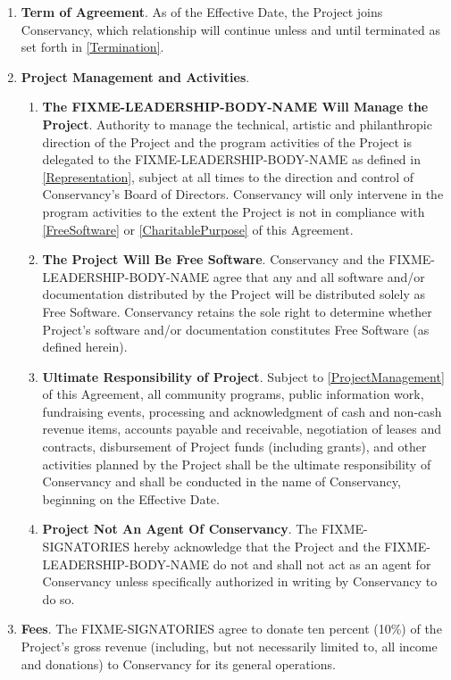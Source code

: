 \documentclass[letterpaper,12pt]{article}
\newcommand{\signatories}{FIXME-SIGNATORIES\xspace}
\newcommand{\leadershipbody}{FIXME-LEADERSHIP-BODY-NAME\xspace}
\begin{document}
\begin{enumerate}[label=\arabic*.,ref=\S~\arabic*]
\item \textbf{Term of Agreement}. As of the Effective Date, the Project
joins Conservancy, which relationship will continue unless and until
terminated as set forth in \ref{Termination}. 
\item \textbf{Project Management and Activities}.


\begin{enumerate}[label=\alph*.,ref=\theenumi(\alph*)]
\item \textbf{The \leadershipbody Will Manage the Project}. \label{ProjectManagement}
Authority to manage the technical, artistic and philanthropic direction
of the Project and the program activities of the Project is delegated
to the \leadershipbody as defined in \ref{Representation},
subject at all times to the direction and control of Conservancy's
Board of Directors. Conservancy will only intervene in the program
activities to the extent the Project is not in compliance with \ref{FreeSoftware}
or \ref{CharitablePurpose} of this Agreement. 
\item \textbf{The Project Will Be Free Software}. \label{FreeSoftware}
Conservancy and the \leadershipbody agree that any and all software
and/or documentation distributed by the Project will be distributed solely as Free Software.
Conservancy retains the sole right to determine whether Project's
software and/or documentation constitutes Free Software (as defined herein).
\item \textbf{Ultimate Responsibility of Project}. Subject to \ref{ProjectManagement}
of this Agreement, all community programs, public information work,
fundraising events, processing and acknowledgment of cash and non-cash
revenue items, accounts payable and receivable, negotiation of leases
and contracts, disbursement of Project funds (including grants), and
other activities planned by the Project shall be the ultimate responsibility
of Conservancy and shall be conducted in the name of Conservancy,
beginning on the Effective Date. 
\item \textbf{Project Not An Agent Of Conservancy}. The \signatories
hereby acknowledge that the Project and the \leadershipbody
do not and shall not act as an agent for Conservancy unless specifically
authorized in writing by Conservancy to do so. 
\end{enumerate}
\item \textbf{Fees}. The \signatories agree to donate ten percent
(10\%) of the Project's gross revenue (including, but not necessarily limited
to, all income and donations) to Conservancy for its general operations.



\end{enumerate}
\end{document}
